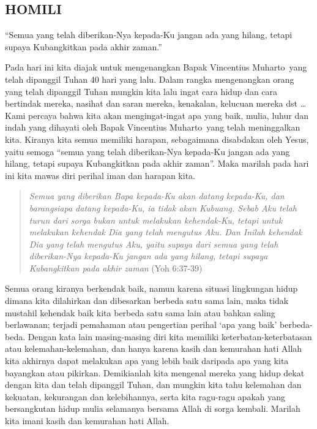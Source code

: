 \documentclass[a5paper,headsepline,titlepage,11pt,nnormalheadings,DIVcalc]{scrbook}
\newcommand{\namaalm}{Bapak Vincentius Muharto~}
\begin{document}
\subsection*{HOMILI}

``Semua yang telah diberikan-Nya kepada-Ku jangan ada yang hilang, tetapi supaya Kubangkitkan pada akhir zaman.''


Pada hari ini kita diajak untuk mengenangkan \namaalm yang telah dipanggil Tuhan 40 hari yang lalu. Dalam rangka mengenangkan orang yang telah dipanggil Tuhan mungkin kita lalu ingat cara hidup dan cara bertindak mereka, nasihat dan saran mereka, kenakalan, kelucuan mereka dst \ldots Kami percaya bahwa kita akan mengingat-ingat apa yang baik, mulia, luhur dan indah yang dihayati oleh \namaalm yang telah meninggalkan kita. Kiranya kita semua memiliki harapan, sebagaimana disabdakan oleh Yesus, yaitu semoga ``semua yang telah diberikan-Nya kepada-Ku jangan ada yang hilang, tetapi supaya Kubangkitkan pada akhir zaman''. Maka marilah pada hari ini kita mawas diri perihal iman dan harapan kita.

\begin{quote}
\textit{Semua yang diberikan Bapa kepada-Ku akan datang kepada-Ku, dan barangsiapa datang kepada-Ku, ia tidak akan Kubuang. Sebab Aku telah turun dari sorga bukan untuk melakukan kehendak-Ku, tetapi untuk melakukan kehendak Dia yang telah mengutus Aku. Dan Inilah kehendak Dia yang telah mengutus Aku, yaitu supaya dari semua yang telah diberikan-Nya kepada-Ku jangan ada yang hilang, tetapi supaya Kubangkitkan pada akhir zaman} (Yoh 6:37-39)
\end{quote}

Semua orang kiranya berkendak baik, namun karena situasi lingkungan hidup dimana kita dilahirkan dan dibesarkan berbeda satu sama lain, maka tidak mustahil kehendak baik kita berbeda satu sama lain atau bahkan saling berlawanan; terjadi pemahaman atau pengertian perihal ‘apa yang baik’ berbeda-beda. Dengan kata lain masing-masing diri kita memiliki keterbatan-keterbatasan atau kelemahan-kelemahan, dan hanya karena kasih dan kemurahan hati Allah kita akhirnya dapat melakukan apa yang lebih baik daripada apa yang kita bayangkan atau pikirkan. Demikianlah kita mengenal mereka yang hidup dekat dengan kita dan telah dipanggil Tuhan, dan mungkin kita tahu kelemahan dan kekuatan, kekurangan dan kelebihannya, serta kita ragu-ragu apakah yang bersangkutan hidup mulia selamanya bersama Allah di sorga kembali. Marilah kita imani kasih dan kemurahan hati Allah.
\end{document}
